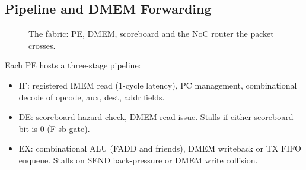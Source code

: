 \documentclass[journal,10pt]{IEEEtran}
\theoremstyle{plain}
\theoremstyle{definition}
\theoremstyle{remark}
\begin{document}
\subsection{Pipeline and DMEM Forwarding}\label{sec:fabric-pipe}

\begin{figure}[!t]\centering

\caption{The fabric: PE, DMEM, scoreboard and the NoC router the packet crosses.}\label{fig:fabricfull}
\end{figure}


Each PE hosts a three-stage pipeline:

\begin{itemize}
\item \textsf{IF}: registered IMEM read (1-cycle latency), PC management,
      combinational decode of opcode, aux, dest, addr fields.
\item \textsf{DE}: scoreboard hazard check, DMEM read issue. Stalls if
      either scoreboard bit is $0$ (\textsf{F-sb-gate}).
\item \textsf{EX}: combinational ALU (FADD and friends), DMEM writeback or
      TX FIFO enqueue. Stalls on SEND back-pressure or DMEM write
      collision.
\end{itemize}
\end{document}
